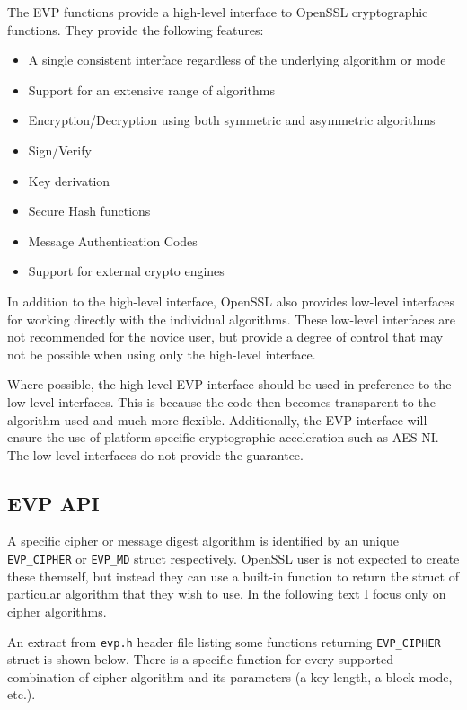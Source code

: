 The EVP functions provide a high-level interface to OpenSSL cryptographic functions. They provide the following features:

\begin{itemize}
  \item A single consistent interface regardless of the underlying algorithm or mode
  \item Support for an extensive range of algorithms
  \item Encryption/Decryption using both symmetric and asymmetric algorithms
  \item Sign/Verify
  \item Key derivation
  \item Secure Hash functions
  \item Message Authentication Codes
  \item Support for external crypto engines
\end{itemize}

In addition to the high-level interface, OpenSSL also provides low-level interfaces for working directly with the individual algorithms. These low-level interfaces are not recommended for the novice user, but provide a degree of control that may not be possible when using only the high-level interface.

Where possible, the high-level EVP interface should be used in preference to the low-level interfaces. This is because the code then becomes transparent to the algorithm used and much more flexible. Additionally, the EVP interface will ensure the use of platform specific cryptographic acceleration such as AES-NI. The low-level interfaces do not provide the guarantee.


\subsection{EVP API}
\label{toc/openssl-evp}

A specific cipher or message digest algorithm is identified by an unique \texttt{EVP\_CIPHER} or \texttt{EVP\_MD} struct respectively. OpenSSL user is not expected to create these themself, but instead they can use a built-in function to return the struct of particular algorithm that they wish to use. In the following text I focus only on cipher algorithms.

An extract from \texttt{evp.h} header file listing some functions returning \texttt{EVP\_CIPHER} struct is shown below. There is a specific function for every supported combination of cipher algorithm and its parameters (a key length, a block mode, etc.).

